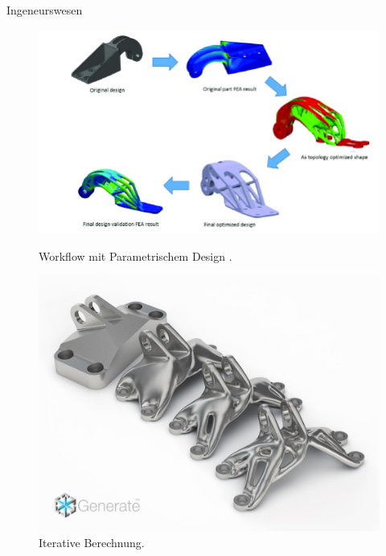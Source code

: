 \documentclass{beamer}
\begin{document}
\begin{frame}{Ingeneurswesen}
       \begin{figure}[H]
        \begin{minipage}{0.4\textwidth}
           \centering
           \vfill
           \includegraphics[width=\linewidth]{figures/beispiele/gebisa-topo-workflow.png}
           \caption{Workflow mit Parametrischem Design \parencite{gebisa2017}.}
           \label{fig:ing-1}
        \end{minipage}
            \hfill
        \begin{minipage}{0.4\textwidth}
           \centering
           \vfill
           \includegraphics[width=\linewidth]{figures/beispiele/topo-ingeneur-2.jpg}
           \caption{Iterative Berechnung.}
           \label{fig:ing-2}
        \end{minipage}
    \end{figure} 
\end{frame}
\end{document}

